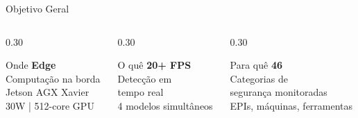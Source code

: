 \begin{frame}{Objetivo Geral}
  \begin{columns}[c]
    \begin{column}{0.30\textwidth}
      {
      \begin{block}{\centering Onde}
        \centering\smallskip
        {\color{inputcolor}\fontsize{18}{22}\selectfont\textbf{Edge}}\\[2pt]
        {\footnotesize Computa\c{c}\~{a}o na borda\\Jetson AGX Xavier}\\[1pt]
        {\tiny\color{sublabelcolor} 30W | 512-core GPU}
        \smallskip
      \end{block}
      }
    \end{column}
    \begin{column}{0.30\textwidth}
      {
      \begin{block}{\centering O qu\^{e}}
        \centering\smallskip
        {\color{headcolor}\fontsize{18}{22}\selectfont\textbf{20+ FPS}}\\[2pt]
        {\footnotesize Detec\c{c}\~{a}o em\\tempo real}\\[1pt]
        {\tiny\color{sublabelcolor} 4 modelos simult\^{a}neos}
        \smallskip
      \end{block}
      }
    \end{column}
    \begin{column}{0.30\textwidth}
      {
      \begin{block}{\centering Para qu\^{e}}
        \centering\smallskip
        {\color{outputcolor}\fontsize{18}{22}\selectfont\textbf{46}}\\[2pt]
        {\footnotesize Categorias de\\seguran\c{c}a monitoradas}\\[1pt]
        {\tiny\color{sublabelcolor} EPIs, m\'{a}quinas, ferramentas}
        \smallskip
      \end{block}
      }
    \end{column}
  \end{columns}
  \vfill
\end{frame}

